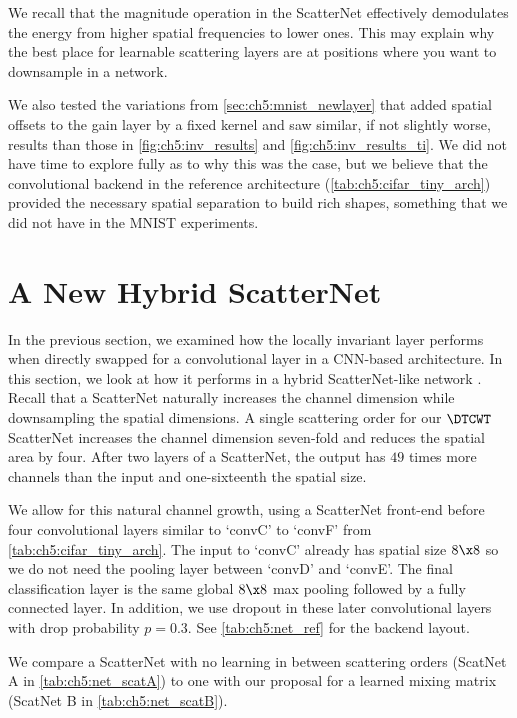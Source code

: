We recall that the magnitude operation in the ScatterNet effectively
demodulates the energy from higher spatial frequencies to lower ones. This
may explain why the best place for learnable scattering layers
are at positions where you want to downsample in a network.

We also tested the variations from \autoref{sec:ch5:mnist_newlayer} that added
spatial offsets to the gain layer by a fixed kernel and saw similar, if not
slightly worse, results than those in \autoref{fig:ch5:inv_results} and
\autoref{fig:ch5:inv_results_ti}. We did not
have time to explore fully as to why this was the case, but we believe that the
convolutional backend in the reference architecture (\autoref{tab:ch5:cifar_tiny_arch})
provided the necessary spatial separation to build rich shapes, something that
we did not have in the MNIST experiments.

\section{A New Hybrid ScatterNet}\label{sec:ch5:scat_exp}


In the previous section, we examined how the locally invariant layer performs when
directly swapped for a convolutional layer in a CNN-based architecture.
In this section, we look at how it performs in a hybrid ScatterNet-like network
\cite{oyallon_scaling_2017}. Recall that a ScatterNet
naturally increases the channel dimension while downsampling the spatial
dimensions. A single scattering order for our $\DTCWT$ ScatterNet increases the channel dimension 
seven-fold and reduces the spatial area by four. After two layers of a
ScatterNet, the output has $49$ times more channels than the input and
one-sixteenth the spatial size.

We allow for this natural channel growth, using a ScatterNet front-end before
four convolutional layers similar to `convC' to `convF' from
\autoref{tab:ch5:cifar_tiny_arch}. The input to `convC' already has spatial size
$8\x 8$ so we do not need the pooling layer between `convD' and `convE'. The
final classification layer is the same global $8\x 8$ max pooling followed by a
fully connected layer. In addition, we use dropout in these later convolutional
layers with drop probability $p=0.3$. See \autoref{tab:ch5:net_ref} for the
backend layout. 

We compare a ScatterNet with no learning in between scattering orders (ScatNet A
in \autoref{tab:ch5:net_scatA}) to one with our proposal for a learned mixing
matrix (ScatNet B in \autoref{tab:ch5:net_scatB}). 

